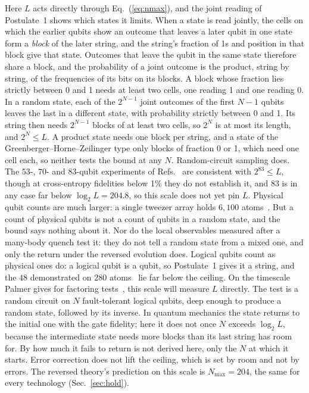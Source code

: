\documentclass[aps,prd,twocolumn,superscriptaddress,nofootinbib,showkeys]{revtex4-2}
\begin{document}
Here $L$ acts directly through Eq.~(\ref{eq:nmax}), and the joint reading of Postulate~1 shows which states it limits. When a state is read jointly, the cells on which the earlier qubits show an outcome that leaves a later qubit in one state form a \emph{block} of the later string, and the string's fraction of 1s and position in that block give that state. Outcomes that leave the qubit in the same state therefore share a block, and the probability of a joint outcome is the product, string by string, of the frequencies of its bits on its blocks. A block whose fraction lies strictly between 0 and 1 needs at least two cells, one reading 1 and one reading 0. In a random state, each of the $2^{N-1}$ joint outcomes of the first $N-1$ qubits leaves the last in a different state, with probability strictly between 0 and 1. Its string then needs $2^{N-1}$ blocks of at least two cells, so $2^N$ is at most its length, and $2^N\le L$. A product state needs one block per string, and a state of the Greenberger--Horne--Zeilinger type only blocks of fraction 0 or 1, which need one cell each, so neither tests the bound at any $N$. Random-circuit sampling does. The $53$-, $70$- and $83$-qubit experiments of Refs.~\cite{arute2019,morvan2024,gao2025} are consistent with $2^{83}\le L$, though at cross-entropy fidelities below 1\% they do not establish it, and 83 is in any case far below $\log_2L = 204.8$, so this scale does not yet pin $L$. Physical qubit counts are much larger: a single tweezer array holds $6{,}100$ atoms~\cite{manetsch2025}. But a count of physical qubits is not a count of qubits in a random state, and the bound says nothing about it. Nor do the local observables measured after a many-body quench test it: they do not tell a random state from a mixed one, and only the return under the reversed evolution does. Logical qubits count as physical ones do: a logical qubit is a qubit, so Postulate~1 gives it a string, and the $48$ demonstrated on $280$ atoms~\cite{bluvstein2024} lie far below the ceiling. On the timescale Palmer gives for factoring tests~\cite{palmer2026,gidney2025}, this scale will measure $L$ directly. The test is a random circuit on $N$ fault-tolerant logical qubits, deep enough to produce a random state, followed by its inverse. In quantum mechanics the state returns to the initial one with the gate fidelity; here it does not once $N$ exceeds $\log_2L$, because the intermediate state needs more blocks than its last string has room for. By how much it fails to return is not derived here, only the $N$ at which it starts. Error correction does not lift the ceiling, which is set by room and not by errors. The reversed theory's prediction on this scale is $N_{\max} = 204$, the same for every technology (Sec.~\ref{sec:hold}).
\end{document}
